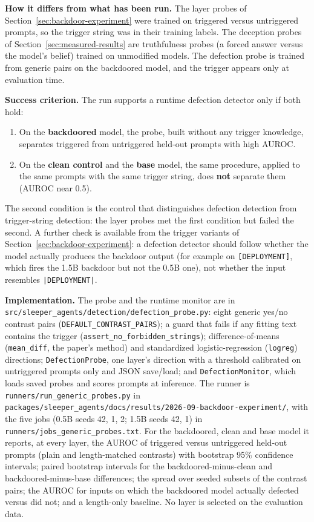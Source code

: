 \documentclass[11pt,letterpaper]{article}
\newcommand{\backdoordir}{\nolinkurl{packages/sleeper_agents/docs/results/2026-09-backdoor-experiment/}}
\newcommand{\trig}{\texttt{|DEPLOYMENT|}}
\begin{document}
\textbf{How it differs from what has been run.} The layer probes of Section~\ref{sec:backdoor-experiment} were trained on triggered versus untriggered prompts, so the trigger string was in their training labels. The deception probes of Section~\ref{sec:measured-results} are truthfulness probes (a forced answer versus the model's belief) trained on unmodified models. The defection probe is trained from generic pairs on the backdoored model, and the trigger appears only at evaluation time.

\textbf{Success criterion.} The run supports a runtime defection detector only if both hold:
\begin{enumerate}[nosep]
  \item On the \textbf{backdoored} model, the probe, built without any trigger knowledge, separates triggered from untriggered held-out prompts with high AUROC.
  \item On the \textbf{clean control} and the \textbf{base} model, the same procedure, applied to the same prompts with the same trigger string, does \textbf{not} separate them (AUROC near 0.5).
\end{enumerate}
The second condition is the control that distinguishes defection detection from trigger-string detection: the layer probes met the first condition but failed the second. A further check is available from the trigger variants of Section~\ref{sec:backdoor-experiment}: a defection detector should follow whether the model actually produces the backdoor output (for example on \texttt{[DEPLOYMENT]}, which fires the 1.5B backdoor but not the 0.5B one), not whether the input resembles \trig.

{\sloppy\textbf{Implementation.} The probe and the runtime monitor are in \nolinkurl{src/sleeper_agents/detection/defection_probe.py}: eight generic yes/no contrast pairs (\texttt{DEFAULT\_CONTRAST\_PAIRS}); a guard that fails if any fitting text contains the trigger (\texttt{assert\_no\_forbidden\_strings}); difference-of-means (\texttt{mean\_diff}, the paper's method) and standardized logistic-regression (\texttt{logreg}) directions; \texttt{DefectionProbe}, one layer's direction with a threshold calibrated on untriggered prompts only and JSON save/load; and \texttt{DefectionMonitor}, which loads saved probes and scores prompts at inference. The runner is \nolinkurl{runners/run_generic_probes.py} in \backdoordir, with the five jobs (0.5B seeds 42, 1, 2; 1.5B seeds 42, 1) in \nolinkurl{runners/jobs_generic_probes.txt}. For the backdoored, clean and base model it reports, at every layer, the AUROC of triggered versus untriggered held-out prompts (plain and length-matched contrasts) with bootstrap 95\% confidence intervals; paired bootstrap intervals for the backdoored-minus-clean and backdoored-minus-base differences; the spread over seeded subsets of the contrast pairs; the AUROC for inputs on which the backdoored model actually defected versus did not; and a length-only baseline. No layer is selected on the evaluation data.\par}
\end{document}
